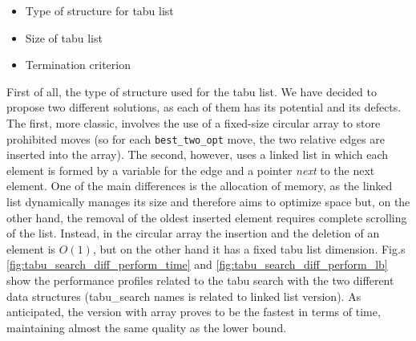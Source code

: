\begin{itemize}
\item Type of structure for tabu list
\item Size of tabu list
\item Termination criterion
\end{itemize}

First of all, the type of structure used for the tabu list. We have decided to propose two different solutions, as each of them has its potential and its defects. The first, more classic, involves the use of a fixed-size circular array to store prohibited moves (so for each \texttt{best\_two\_opt} move, the two relative edges are inserted into the array). The second, however, uses a linked list in which each element is formed by a variable for the edge and a pointer \textit{next} to the next element.
One of the main differences is the allocation of memory, as the linked list dynamically manages its size and therefore aims to optimize space but, on the other hand, the removal of the oldest inserted element requires complete scrolling of the list. Instead, in the circular array the insertion and the deletion of an element is $O(1)$, but on the other hand it has a fixed tabu list dimension.
Fig.s \ref{fig:tabu_search_diff_perform_time} and \ref{fig:tabu_search_diff_perform_lb} show the performance profiles related to the tabu search with the two different data structures (tabu\_search names is related to linked list version). As anticipated, the version with array proves to be the fastest in terms of time, maintaining almost the same quality as the lower bound. \\

